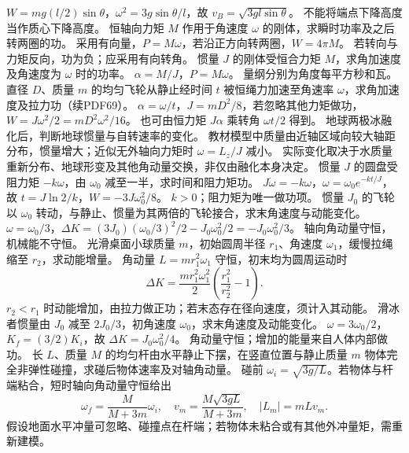 \workings $W=mg(l/2)\sin\theta$，$\omega^2=3g\sin\theta/l$，故 $v_B=\sqrt{3gl\sin\theta}$。
\crosscheck 不能将端点下降高度当作质心下降高度。
\problemtext 恒轴向力矩 $M$ 作用于角速度 $\omega$ 的刚体，求瞬时功率及之后转两圈的功。
\workings 采用有向量，$P=M\omega$，若沿正方向转两圈，$W=4\pi M$。
\crosscheck 若转向与力矩反向，功为负；应采用有向转角。
\problemtext 惯量 $J$ 的刚体受恒合力矩 $M$，求角加速度及角速度为 $\omega$ 时的功率。
\workings $\alpha=M/J$，$P=M\omega$。
\crosscheck 量纲分别为角度每平方秒和瓦。
\problemtext 直径 $D$、质量 $m$ 的均匀飞轮从静止经时间 $t$ 被恒绳力加速至角速率 $\omega$，求角加速度及拉力功（续PDF69）。
\workings $\alpha=\omega/t$，$J=mD^2/8$，若忽略其他力矩做功，$W=J\omega^2/2=mD^2\omega^2/16$。
\crosscheck 也可由恒力矩 $J\alpha$ 乘转角 $\omega t/2$ 得到。
\problemtext 地球两极冰融化后，判断地球惯量与自转速率的变化。
\workings 教材模型中质量由近轴区域向较大轴距分布，惯量增大；近似无外轴向力矩时 $\omega=L_z/J$ 减小。
\crosscheck 实际变化取决于水质量重新分布、地球形变及其他角动量交换，非仅由融化本身决定。
\problemtext 惯量 $J$ 的圆盘受阻力矩 $-k\omega$，由 $\omega_0$ 减至一半，求时间和阻力矩功。
\workings $J\dot\omega=-k\omega$，$\omega=\omega_0e^{-kt/J}$，故 $t=J\ln2/k$，$W=-3J\omega_0^2/8$。
\crosscheck $k>0$；阻力矩为唯一做功项。
\problemtext 惯量 $J_0$ 的飞轮以 $\omega_0$ 转动，与静止、惯量为其两倍的飞轮接合，求末角速度与动能变化。
\workings $\omega=\omega_0/3$，$\Delta K=(3J_0)(\omega_0/3)^2/2-J_0\omega_0^2/2=-J_0\omega_0^2/3$。
\crosscheck 轴向角动量守恒，机械能不守恒。
\problemtext 光滑桌面小球质量 $m$，初始圆周半径 $r_1$、角速度 $\omega_1$，缓慢拉绳缩至 $r_2$，求动能增量。
\workings 角动量 $L=mr_1^2\omega_1$ 守恒，初末均为圆周运动时
\[
\Delta K=\frac{m r_1^2\omega_1^2}{2}\left(\frac{r_1^2}{r_2^2}-1\right).
\]
\crosscheck $r_2<r_1$ 时动能增加，由拉力做正功；若末态存在径向速度，须计入其动能。
\problemtext 滑冰者惯量由 $J_0$ 减至 $2J_0/3$，初角速度 $\omega_0$，求末角速度及动能变化。
\workings $\omega=3\omega_0/2$，$K_f=(3/2)K_i$，故 $\Delta K=J_0\omega_0^2/4$。
\crosscheck 角动量守恒；增加的能量来自人体内部做功。
\problemtext 长 $L$、质量 $M$ 的均匀杆由水平静止下摆，在竖直位置与静止质量 $m$ 物体完全非弹性碰撞，求碰后物体速率及对轴角动量。
\workings 碰前 $\omega_i=\sqrt{3g/L}$。若物体与杆端粘合，短时轴向角动量守恒给出
\[
\omega_f=\frac{M}{M+3m}\omega_i,\quad
v_m=\frac{M\sqrt{3gL}}{M+3m},\quad
|L_m|=mLv_m.
\]
\crosscheck 假设地面水平冲量可忽略、碰撞点在杆端；若物体未粘合或有其他外冲量矩，需重新建模。

